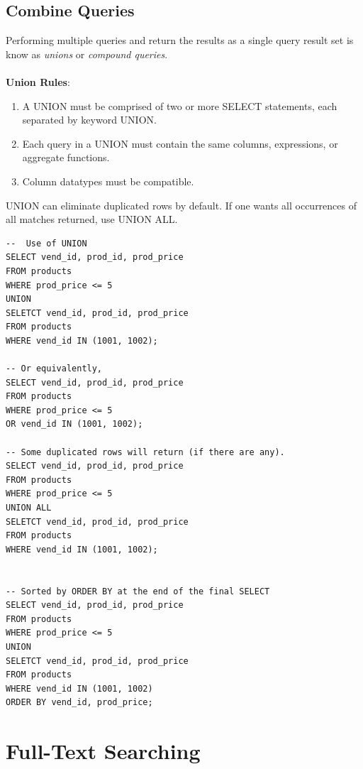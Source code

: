 \documentclass[12pt,oneside,a4paper]{article}
\begin{document}
\subsection{Combine Queries}
Performing multiple queries and return the results as a single query result set is know as \emph{unions} or \emph{compound queries}. 
\\~\\
\textbf{Union Rules}: 
\begin{enumerate}
	
\item A UNION must be comprised of two or more SELECT statements, each separated by keyword UNION.

\item Each query in a UNION must contain the same columns, expressions, or aggregate functions. 

\item Column datatypes must be compatible.  
\end{enumerate}

\textsf{UNION} can eliminate duplicated rows by default. If one wants all occurrences of all matches returned, use \textsf{UNION ALL}. 

\begin{lstlisting}
--  Use of UNION
SELECT vend_id, prod_id, prod_price
FROM products
WHERE prod_price <= 5
UNION
SELETCT vend_id, prod_id, prod_price
FROM products
WHERE vend_id IN (1001, 1002);

-- Or equivalently,
SELECT vend_id, prod_id, prod_price
FROM products
WHERE prod_price <= 5 
OR vend_id IN (1001, 1002);

-- Some duplicated rows will return (if there are any).
SELECT vend_id, prod_id, prod_price
FROM products
WHERE prod_price <= 5
UNION ALL
SELETCT vend_id, prod_id, prod_price
FROM products
WHERE vend_id IN (1001, 1002);


-- Sorted by ORDER BY at the end of the final SELECT
SELECT vend_id, prod_id, prod_price
FROM products
WHERE prod_price <= 5
UNION
SELETCT vend_id, prod_id, prod_price
FROM products
WHERE vend_id IN (1001, 1002)
ORDER BY vend_id, prod_price;
\end{lstlisting}

\section{Full-Text Searching}
\end{document}
